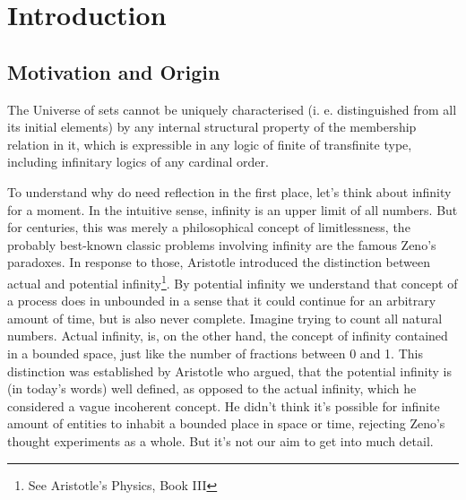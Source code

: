 \section{Introduction}\label{sec:introduction}

\subsection{Motivation and Origin}
\begin{displayquote}
The Universe of sets cannot be uniquely characterised (i. e. distinguished from all its initial elements) by any internal structural property of the membership relation in it, which is expressible in any logic of finite of transfinite type, including infinitary logics of any cardinal order.
\end{displayquote}

To understand why do need reflection in the first place, let's think about infinity for a moment. In the intuitive sense, infinity is an upper limit of all numbers. But for centuries, this was merely a philosophical concept of limitlessness, the probably best-known classic problems involving infinity are the famous Zeno's paradoxes. In response to those, Aristotle introduced the distinction between actual and potential infinity\footnote{See Aristotle’s Physics, Book III}. By potential infinity we understand that concept of a process does in unbounded in a sense that it could continue for an arbitrary amount of time, but is also never complete. Imagine trying to count all natural numbers. Actual infinity, is, on the other hand, the concept of infinity contained in a bounded space, just like the number of fractions between 0 and 1. This distinction was established by Aristotle who argued, that the potential infinity is (in today's words) well defined, as opposed to the actual infinity, which he considered a vague incoherent concept. He didn't think it's possible for infinite amount of entities to inhabit a bounded place in space or time, rejecting Zeno's thought experiments as a whole. But it's not our aim to get into much detail. 

